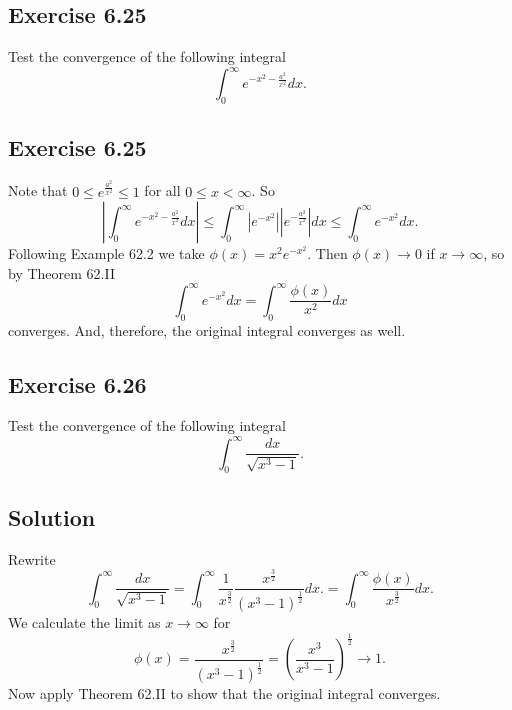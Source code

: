 \subsection*{Exercise 6.25}

Test the convergence of the following integral
\begin{equation*}
    \int_0^{\infty} e^{-x^2 - \frac{a^2}{x^2}} dx.
\end{equation*}

\subsection*{Exercise 6.25}

Note that $0 \leq e^{\frac{a^2}{x^2}} \leq 1$ for all $0 \leq x < \infty$.
So
\begin{equation*}
    \left| \int_0^{\infty} e^{-x^2 - \frac{a^2}{x^2}} dx \right|
        \leq \int_0^{\infty} \left|e^{-x^2}\right| \left|e^{-\frac{a^2}{x^2}}\right| dx
        \leq \int_0^{\infty} e^{-x^2} dx.
\end{equation*}
Following Example 62.2 we take $\phi(x) = x^2e^{-x^2}$.
Then $\phi(x) \to 0$ if $x \to \infty$, so by Theorem 62.II
\begin{equation*}
    \int_0^{\infty} e^{-x^2} dx = \int_0^{\infty} \frac{\phi(x)}{x^2} dx
\end{equation*}
converges.
And, therefore, the original integral converges as well.


\subsection*{Exercise 6.26}

Test the convergence of the following integral
\begin{equation*}
    \int_0^{\infty} \frac{dx}{\sqrt{x^3 - 1}}.
\end{equation*}

\subsection*{Solution}
Rewrite
\begin{equation*}
    \int_0^{\infty} \frac{dx}{\sqrt{x^3 - 1}}
        = \int_0^{\infty} \frac{1}{x^{\frac{3}{2}}} \frac{x^{\frac{3}{2}}}{(x^3 - 1)^{\frac{1}{2}}} dx.
        = \int_0^{\infty} \frac{\phi(x)}{x^{\frac{3}{2}}} dx.
\end{equation*}
We calculate the limit as $x \to \infty$ for
\begin{equation*}
    \phi(x) = \frac{x^{\frac{3}{2}}}{(x^3 - 1)^{\frac{1}{2}}}
        = \left( \frac{x^3}{x^3 - 1} \right)^{\frac{1}{2}}
        \to 1.
\end{equation*}
Now apply Theorem 62.II to show that the original integral converges.


